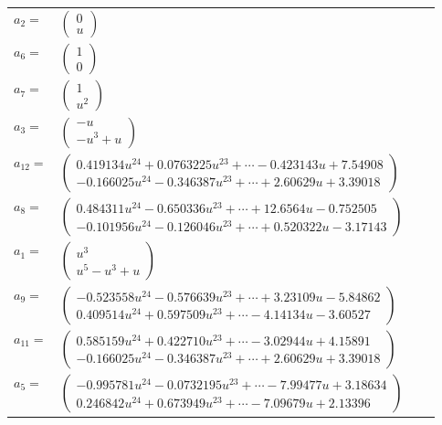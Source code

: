 \documentclass[1p]{elsarticle_modified}
\theoremstyle{definition}
\begin{document}
\begin{tabular}{m{7pt} m{180pt} m{7pt} m{180pt} }
\flushright $a_{2}=$&$\begin{pmatrix}0\\u\end{pmatrix}$ \\
\flushright $a_{6}=$&$\begin{pmatrix}1\\0\end{pmatrix}$ \\
\flushright $a_{7}=$&$\begin{pmatrix}1\\u^2\end{pmatrix}$ \\
\flushright $a_{3}=$&$\begin{pmatrix}- u\\- u^3+u\end{pmatrix}$ \\
\flushright $a_{12}=$&$\begin{pmatrix}0.419134 u^{24}+0.0763225 u^{23}+\cdots-0.423143 u+7.54908\\-0.166025 u^{24}-0.346387 u^{23}+\cdots+2.60629 u+3.39018\end{pmatrix}$ \\
\flushright $a_{8}=$&$\begin{pmatrix}0.484311 u^{24}-0.650336 u^{23}+\cdots+12.6564 u-0.752505\\-0.101956 u^{24}-0.126046 u^{23}+\cdots+0.520322 u-3.17143\end{pmatrix}$ \\
\flushright $a_{1}=$&$\begin{pmatrix}u^3\\u^5- u^3+u\end{pmatrix}$ \\
\flushright $a_{9}=$&$\begin{pmatrix}-0.523558 u^{24}-0.576639 u^{23}+\cdots+3.23109 u-5.84862\\0.409514 u^{24}+0.597509 u^{23}+\cdots-4.14134 u-3.60527\end{pmatrix}$ \\
\flushright $a_{11}=$&$\begin{pmatrix}0.585159 u^{24}+0.422710 u^{23}+\cdots-3.02944 u+4.15891\\-0.166025 u^{24}-0.346387 u^{23}+\cdots+2.60629 u+3.39018\end{pmatrix}$ \\
\flushright $a_{5}=$&$\begin{pmatrix}-0.995781 u^{24}-0.0732195 u^{23}+\cdots-7.99477 u+3.18634\\0.246842 u^{24}+0.673949 u^{23}+\cdots-7.09679 u+2.13396\end{pmatrix}$ \\

\end{tabular}
\end{document}
